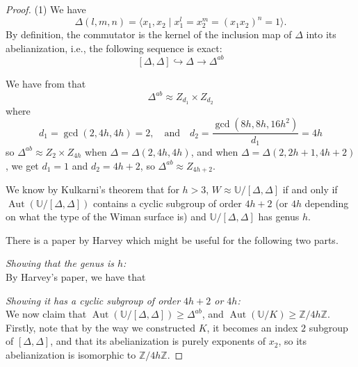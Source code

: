 \documentclass[reqno]{amsart}
\theoremstyle{definition}
\theoremstyle{remark}
\DeclareMathOperator{\Aut}{Aut}
\begin{document}
\begin{proof}
    (1)
    We have 
    \[
    \Delta (l,m,n) =
    \langle x_1, x_2 \mid 
    x_1^l = x_2^m = (x_1 x_2)^{n} = 1
    \rangle.
    \]
    By definition, the commutator is
    the kernel of the inclusion map
    of $\Delta$ into its abelianization, i.e.,
    the following sequence is exact:
    \[
    \left[ \Delta, \Delta \right] \hookrightarrow
    \Delta \to \Delta^{ab}
    \]

    We have from \cite[p~105]{Albar-Al-Hamdan} that 
   \[
    \Delta^{ab}
    \approx Z_{d_1} \times Z_{d_2}\]
where
\[d_1 = \gcd(2,4h,4h) = 2, \quad
\text{and} \quad d_2 = \frac{\gcd(8h, 8h, 16h^2)}
{d_1}
= 4h\]
so $\Delta^{ab}
    \approx Z_2 \times Z_{4h}$ when
    $\Delta = \Delta (2,4h, 4h)$, and
    when $\Delta = \Delta (2,2h+1,4h+2)$, we
    get $d_1 = 1$ and $d_2 = 4h+2$, so
    $\Delta^{ab} \approx Z_{4h+2}$.

    We know by Kulkarni's theorem that for $h >3$,
    $W \approx \mathbb{U}/ \left[\Delta, \Delta \right]$ if and only if
    $\Aut (\mathbb{U}/ \left[\Delta, \Delta \right]) $ contains a cyclic subgroup of
    order $4h+2$ (or $4h$ depending on what the type of the Wiman surface is) and $\mathbb{U}/ \left[\Delta, \Delta \right]$
    has genus $h$.\\
    \linebreak

There is a paper by Harvey \cite{Harvey} which might be useful for the following two parts.\\
\linebreak


\textit{Showing that the genus is $h$:}\\


By Harvey's paper, we have that 







\textit{Showing it has a cyclic subgroup of order $4h+2$
or $4h$:}\\
\linebreak
We now claim that
$\Aut(\mathbb{U}/ \left[\Delta, \Delta \right]) \geq
\Delta^{ab}$, and
$\Aut (\mathbb{U}/K) \geq 
\mathbb{Z}/4h\mathbb{Z}$.\\
Firstly, note that by the way we constructed $K$,
it becomes an index $2$ subgroup of $\left[\Delta, \Delta \right]$, and that its abelianization is purely exponents
of $x_2$, so its abelianization is isomorphic to
$\mathbb{Z}/4h \mathbb{Z}$.





\end{proof}
\end{document}

